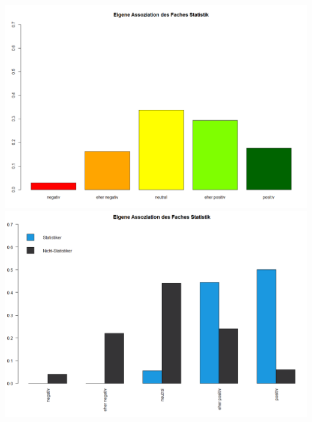 \documentclass[12pt,a4paper,titlepage=true,parskip,ngerman]{scrartcl}
\begin{document}
\hspace{-2cm}
\includegraphics[scale=0.3]{barplot_Assoziation}
\includegraphics[scale=0.3]{(nicht)-statis_barplot_Assoziation} \\
\end{document}
